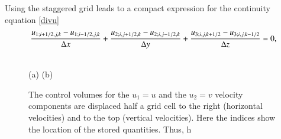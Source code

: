 Using the staggered grid leads to a compact expression for the continuity equation
\eqref{divu}
\begin{equation}
{u_{1;i+1/2,j,k}- u_{1;i-1/2,j,k}\over \Delta x}+ 
{u_{2;i,j+1/2,k}- u_{2;i,j-1/2,k}\over \Delta y}+
{u_{3;i,j,k+1/2}- u_{3;i,j,k-1/2}\over \Delta z}=0,
\label{cont2}
\end{equation}
\begin{figure}
\begin{center}{ \quad
{}  }\\
    (a) \hskip 5cm (b)
\end{center}
\caption{The control volumes for the $u_1=u$ and the $u_2=v$ velocity components are displaced 
half a grid cell to the right (horizontal velocities) and to the top (vertical velocities). Here the 
indices show the location of the stored quantities. Thus, h}
\end{figure}
